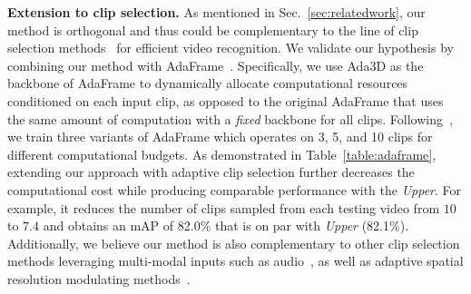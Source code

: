 \documentclass[final]{cvpr}
\newcommand{\system}{{Ada3D}\xspace}
\begin{document}
   

\begin{table}[!t] \centering
    \vspace{-0.1in}
    \caption{\textbf{Extension to clip-level selection.} Combining \system with AdaFrame~\cite{adaframe} offers computational savings for video-level aggregation. \#\,Clip denotes number of clips used per testing video; \emph{Van} (Vanilla) and \emph{Ada} denote our method without and with AdaFrame, respectively.}
    \label{table:adaframe}
    \end{table}

    
\vspace{0.05in}
\noindent\textbf{Extension to clip selection.} As mentioned in Sec.~\ref{sec:relatedwork}, our method is orthogonal and thus could be complementary to the line of clip selection methods~\cite{marl,adaframe,scsampler,listentolook} for efficient video recognition. We validate our hypothesis by combining our method with AdaFrame~\cite{adaframe}. Specifically, we use \system as the backbone of AdaFrame to dynamically allocate computational resources conditioned on each input clip, as opposed to the original AdaFrame that uses the same amount of computation with a \emph{fixed} backbone for all clips. Following~\cite{adaframe}, we train three variants of AdaFrame which operates on 3, 5, and 10 clips for different computational budgets. As demonstrated in Table~\ref{table:adaframe}, extending our approach with adaptive clip selection further decreases the computational cost while producing comparable performance with the \emph{Upper}. For example, it reduces the number of clips sampled from each testing video from $10$ to $7.4$ and obtains an mAP of 82.0$\%$ that is on par with \emph{Upper} (82.1$\%$). Additionally, we believe our method is also complementary to other clip selection methods leveraging multi-modal inputs such as audio~\cite{scsampler,listentolook}, as well as adaptive spatial resolution modulating methods~\cite{arnet,whenandwhere,huanggaoresolution}.
\end{document}
